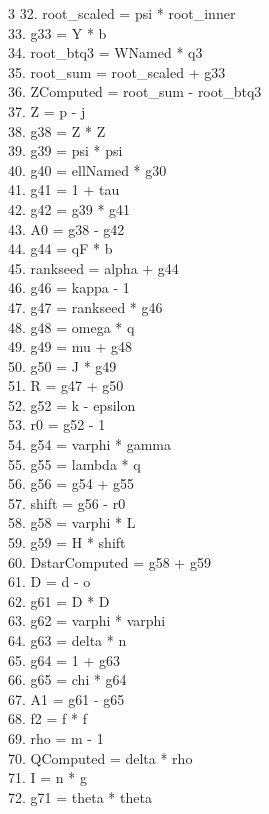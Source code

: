\documentclass[10pt]{article}
\begin{document}
\begin{multicols}{3}
32. root\_scaled = psi * root\_inner\\
33. g33 = Y * b\\
34. root\_btq3 = WNamed * q3\\
35. root\_sum = root\_scaled + g33\\
36. ZComputed = root\_sum - root\_btq3\\
37. Z = p - j\\
38. g38 = Z * Z\\
39. g39 = psi * psi\\
40. g40 = ellNamed * g30\\
41. g41 = 1 + tau\\
42. g42 = g39 * g41\\
43. A0 = g38 - g42\\
44. g44 = qF * b\\
45. rankseed = alpha + g44\\
46. g46 = kappa - 1\\
47. g47 = rankseed * g46\\
48. g48 = omega * q\\
49. g49 = mu + g48\\
50. g50 = J * g49\\
51. R = g47 + g50\\
52. g52 = k - epsilon\\
53. r0 = g52 - 1\\
54. g54 = varphi * gamma\\
55. g55 = lambda * q\\
56. g56 = g54 + g55\\
57. shift = g56 - r0\\
58. g58 = varphi * L\\
59. g59 = H * shift\\
60. DstarComputed = g58 + g59\\
61. D = d - o\\
62. g61 = D * D\\
63. g62 = varphi * varphi\\
64. g63 = delta * n\\
65. g64 = 1 + g63\\
66. g65 = chi * g64\\
67. A1 = g61 - g65\\
68. f2 = f * f\\
69. rho = m - 1\\
70. QComputed = delta * rho\\
71. I = n * g\\
72. g71 = theta * theta\\

\end{multicols}
\end{document}

